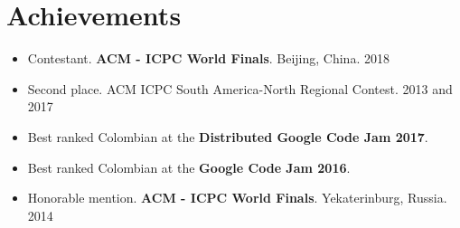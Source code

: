 \documentclass[11pt,a4paper,sans]{moderncv}        %
\begin{document}
\section{Achievements}

\begin{itemize}
  \item{Contestant. \textbf{ACM - ICPC World Finals}. Beijing, China. 2018}
  \item{Second place. ACM ICPC South America-North Regional Contest. 2013 and 2017} %
  \item{Best ranked Colombian at the \textbf{Distributed Google Code Jam 2017}}. %
  \item{Best ranked Colombian at the \textbf{Google Code Jam 2016}}. %
  \item{Honorable mention. \textbf{ACM - ICPC World Finals}. Yekaterinburg, Russia. 2014}
\end{itemize}
\end{document}
